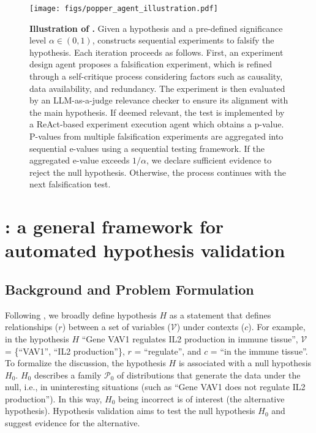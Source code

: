 
\begin{figure*}[t!]
    \centering
    \captionsetup{font=small}
\texttt{[image: figs/popper\_agent\_illustration.pdf]}
\vspace{-2mm}
    \caption{\textbf{Illustration of \mname.} Given a hypothesis and a pre-defined significance level $\alpha\in (0,1)$, \mname constructs sequential experiments to falsify the hypothesis. Each iteration proceeds as follows. First, an experiment design agent proposes a falsification experiment, which is refined through a self-critique process considering factors such as causality, data availability, and redundancy. The experiment is then evaluated by an LLM-as-a-judge relevance checker to ensure its alignment with the main hypothesis. If deemed relevant, the test is implemented by a ReAct-based experiment execution agent which obtains a p-value. P-values from multiple falsification experiments are aggregated into sequential e-values using a sequential testing framework. If the aggregated e-value exceeds $1/\alpha$, we declare sufficient evidence to reject the null hypothesis. Otherwise, the process continues with the next falsification test.} 
    \label{fig:method}
    \vspace{-4mm}
\end{figure*}

\vspace{-2mm}
\section{\mname: a general framework for automated hypothesis validation}

\subsection{Background and Problem Formulation}

Following \citet{majumder2024discoverybench,thompson2023scope}, we broadly define hypothesis $H$ as a statement that defines relationships ($r$) between a set of variables ($\mathcal{V}$) under contexts ($c$). For example, in the hypothesis $H$ ``Gene VAV1 regulates IL2 production in immune tissue'', $\mathcal{V}$= \{``VAV1'',  ``IL2 production''\}, $r$ = ``regulate'', and $c$ = ``in the immune tissue''.   
To formalize the discussion, the hypothesis $H$ is associated with a null hypothesis $H_0$. $H_0$  describes a family $\mathcal{P}_0$ of distributions that generate the data under the null, i.e., in uninteresting situations (such as ``Gene VAV1 does not regulate IL2 production''). In this way, $H_0$ being incorrect is of interest (the alternative hypothesis).  
Hypothesis validation aims to test the null hypothesis $H_0$ and suggest evidence for the alternative. 

